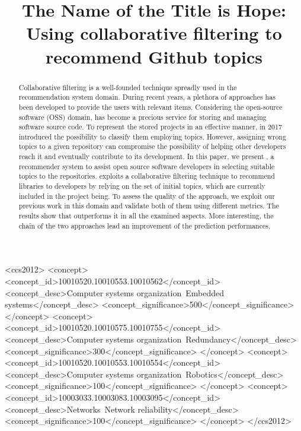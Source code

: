 \documentclass[sigconf]{acmart}
\begin{document}
\title{The Name of the Title is Hope}

\title{\CT: Using collaborative filtering to recommend Github topics}







\begin{abstract}
Collaborative filtering is a well-founded technique spreadly used in the recommendation system domain. During recent years, a plethora of approaches has been developed to provide the users with relevant items. Considering the open-source software (OSS) domain, \GH has become a precious service for storing and managing software source code. To represent the stored projects in an effective manner, in 2017 \GH introduced the possibility to classify them employing topics. However, assigning wrong topics to a given repository can compromise the possibility of helping other developers reach it and eventually contribute to its development.
In this paper, we present \CT, a recommender system to assist open source software developers in selecting suitable topics to the repositories. \CT exploits a collaborative filtering technique to recommend libraries to developers by relying on the set of initial topics, which are currently included in the project being. To assess the quality of the approach, we exploit our previous work in this domain and validate both of them using different metrics. The results show that \CT outperforms it in all the examined aspects. More interesting, the chain of the two approaches lead an improvement of the prediction performances.
\end{abstract}

\begin{CCSXML}
<ccs2012>
 <concept>
  <concept_id>10010520.10010553.10010562</concept_id>
  <concept_desc>Computer systems organization~Embedded systems</concept_desc>
  <concept_significance>500</concept_significance>
 </concept>
 <concept>
  <concept_id>10010520.10010575.10010755</concept_id>
  <concept_desc>Computer systems organization~Redundancy</concept_desc>
  <concept_significance>300</concept_significance>
 </concept>
 <concept>
  <concept_id>10010520.10010553.10010554</concept_id>
  <concept_desc>Computer systems organization~Robotics</concept_desc>
  <concept_significance>100</concept_significance>
 </concept>
 <concept>
  <concept_id>10003033.10003083.10003095</concept_id>
  <concept_desc>Networks~Network reliability</concept_desc>
  <concept_significance>100</concept_significance>
 </concept>
</ccs2012>
\end{CCSXML}
\end{document}
